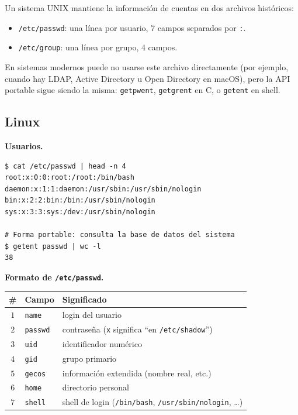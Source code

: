 \documentclass[11pt,a4paper]{article}
\begin{document}
Un sistema UNIX mantiene la información de cuentas en dos archivos
históricos:

\begin{itemize}[leftmargin=*,nosep]
    \item \texttt{/etc/passwd}: una línea por usuario, $7$ campos
        separados por \texttt{:}.
    \item \texttt{/etc/group}: una línea por grupo, $4$ campos.
\end{itemize}

En sistemas modernos puede no usarse este archivo directamente (por
ejemplo, cuando hay LDAP, Active Directory u Open Directory en macOS),
pero la API portable sigue siendo la misma: \texttt{getpwent},
\texttt{getgrent} en C, o \texttt{getent} en shell.

\subsection*{Linux}

\textbf{Usuarios.}

\begin{lstlisting}[style=shellstyle]
$ cat /etc/passwd | head -n 4
root:x:0:0:root:/root:/bin/bash
daemon:x:1:1:daemon:/usr/sbin:/usr/sbin/nologin
bin:x:2:2:bin:/bin:/usr/sbin/nologin
sys:x:3:3:sys:/dev:/usr/sbin/nologin

# Forma portable: consulta la base de datos del sistema
$ getent passwd | wc -l
38
\end{lstlisting}

\textbf{Formato de \texttt{/etc/passwd}.}

\begin{center}
\small
\begin{tabular}{@{}clp{8cm}@{}}
\toprule
\# & Campo & Significado \\
\midrule
$1$ & \texttt{name}   & login del usuario \\
$2$ & \texttt{passwd} & contraseña (\texttt{x} significa ``en \texttt{/etc/shadow}'') \\
$3$ & \texttt{uid}    & identificador numérico \\
$4$ & \texttt{gid}    & grupo primario \\
$5$ & \texttt{gecos}  & información extendida (nombre real, etc.) \\
$6$ & \texttt{home}   & directorio personal \\
$7$ & \texttt{shell}  & shell de login (\texttt{/bin/bash}, \texttt{/usr/sbin/nologin}, \ldots) \\
\bottomrule
\end{tabular}
\end{center}
\end{document}
